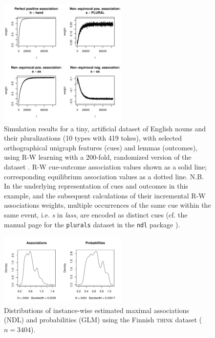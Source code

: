 \documentclass[conference]{IEEEtran}
\begin{document}
\begin{figure}[!t]
\centering
\includegraphics[width=2.5in]{QITL6_abstract_final-plurals_conv.png}
\caption{Simulation results for a tiny, artificial dataset of English nouns and their pluralizations (10 types with 419 tokes), with selected orthographical unigraph features (cues) and lemmas (outcomes), using R-W learning with a 200-fold, randomized version of the dataset \cite[Extension of Fig.~4]{baayenetal2011}. R-W cue-outcome association values shown as a solid line; corresponding equilibrium association values as a dotted line. N.B. In the underlying representation of cues and outcomes in this example, and the subsequent calculations of their incremental R-W associations weights, multiple occurrences of the same cue within the same event, i.e. \textit{s} in \textit{lass}, are encoded as distinct cues (cf. the manual page for the \texttt{plurals} dataset in the \texttt{ndl} package \cite{shaoul2014}).}
\label{plural_weights}
\end{figure}


\begin{figure}[!t]
\centering
\includegraphics[width=2.5in]{QITL6_abstract_final-think_assocs_probs.pdf}
\caption{Distributions of instance-wise estimated maximal associations (NDL) and probabilities (GLM) using the Finnish \textsc{think} dataset ($n=3404$).}
\label{think_assocs_probs}
\end{figure}
\end{document}
